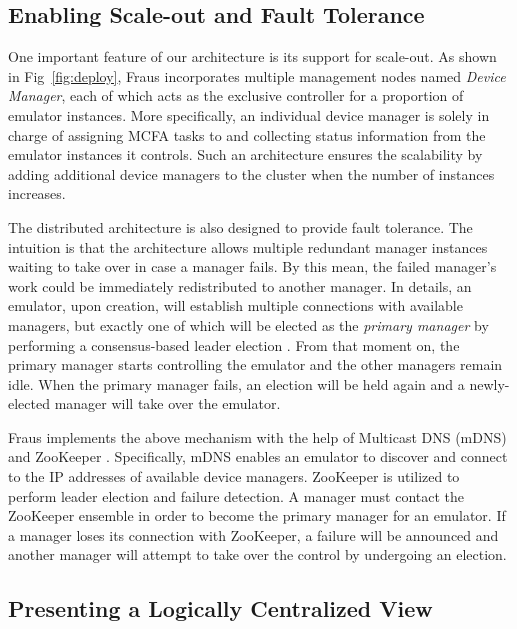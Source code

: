 \documentclass[conference]{IEEEtranl}
\begin{document}
	\subsection{Enabling Scale-out and Fault Tolerance}
	One important feature of our architecture is its support for scale-out. 
	As shown in Fig~\ref{fig:deploy},
	Fraus incorporates multiple management nodes named \textit{Device Manager},
	each of which acts as the exclusive controller for a proportion of emulator instances. 
	More specifically, an individual device manager is solely in charge of assigning MCFA tasks to and collecting status information from the emulator instances it controls. 
	Such an architecture ensures the scalability by adding additional device managers to the cluster when the number of instances increases. 

	The distributed architecture is also designed to provide fault tolerance. The intuition is that the architecture allows multiple redundant manager instances waiting to take over in case a manager fails. By this mean, the failed manager's work could be immediately redistributed to another manager.
	In details, an emulator, upon creation, will establish multiple connections with available managers, but exactly one of which will be elected as the \textit{primary manager} by performing a consensus-based leader election \cite{lynch1996distributed}. From that moment on, the primary manager starts controlling the emulator and the other managers remain idle. When the primary manager fails, an election will be held again and a newly-elected manager will take over the emulator.


	Fraus implements the above mechanism with the help of Multicast DNS (mDNS) \cite{ververidis2008service} and ZooKeeper \cite{hunt2010zookeeper}. Specifically, mDNS enables an emulator to discover and connect to the IP addresses of available device managers.  ZooKeeper is utilized to perform leader election and failure detection. A manager must contact the ZooKeeper ensemble in order to become the primary manager for an emulator. If a manager loses its connection with ZooKeeper, a failure will be announced and another manager will attempt to take over the control by undergoing an election. 



	\subsection{Presenting a Logically Centralized View}
\end{document}
